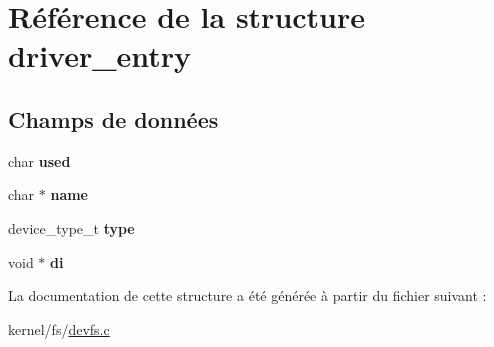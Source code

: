 \hypertarget{structdriver__entry}{\section{Référence de la structure driver\-\_\-entry}
\label{structdriver__entry}
}
\subsection*{Champs de données}
\begin{DoxyCompactItemize}
\item 
\hypertarget{structdriver__entry_a9a2a74aad52e09fb03bef9703530e28f}{char {\bfseries used}}\label{structdriver__entry_a9a2a74aad52e09fb03bef9703530e28f}

\item 
\hypertarget{structdriver__entry_afc014b612d6cedf602aab7255d4576c1}{char $\ast$ {\bfseries name}}\label{structdriver__entry_afc014b612d6cedf602aab7255d4576c1}

\item 
\hypertarget{structdriver__entry_a3d74a551a1bbb2f2583ba058877b52a4}{device\-\_\-type\-\_\-t {\bfseries type}}\label{structdriver__entry_a3d74a551a1bbb2f2583ba058877b52a4}

\item 
\hypertarget{structdriver__entry_ab5b691637ec5edbbe58442fc57f5aba4}{void $\ast$ {\bfseries di}}\label{structdriver__entry_ab5b691637ec5edbbe58442fc57f5aba4}

\end{DoxyCompactItemize}


La documentation de cette structure a été générée à partir du fichier suivant \-:\begin{DoxyCompactItemize}
\item 
kernel/fs/\hyperlink{devfs_8c}{devfs.\-c}\end{DoxyCompactItemize}
